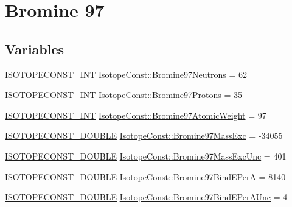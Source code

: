 \hypertarget{group___isotope_const-_bromine-_br97}{}\section{Bromine 97}
\label{group___isotope_const-_bromine-_br97}
\subsection*{Variables}
\begin{DoxyCompactItemize}
\item 
\mbox{\hyperlink{group___isotope_const-_macros_ga5f18360b3e99483a35c32d789e62621c}{I\+S\+O\+T\+O\+P\+E\+C\+O\+N\+S\+T\+\_\+\+I\+NT}} \mbox{\hyperlink{group___isotope_const-_bromine-_br97_ga8d974f27ddbcbc1719a4680f448e9ecb}{Isotope\+Const\+::\+Bromine97\+Neutrons}} = 62
\item 
\mbox{\hyperlink{group___isotope_const-_macros_ga5f18360b3e99483a35c32d789e62621c}{I\+S\+O\+T\+O\+P\+E\+C\+O\+N\+S\+T\+\_\+\+I\+NT}} \mbox{\hyperlink{group___isotope_const-_bromine-_br97_gaf2ad3b793c2c9725fee9b281a5376de7}{Isotope\+Const\+::\+Bromine97\+Protons}} = 35
\item 
\mbox{\hyperlink{group___isotope_const-_macros_ga5f18360b3e99483a35c32d789e62621c}{I\+S\+O\+T\+O\+P\+E\+C\+O\+N\+S\+T\+\_\+\+I\+NT}} \mbox{\hyperlink{group___isotope_const-_bromine-_br97_ga4f35e98183cc28f7e3f99f2aa4cc3824}{Isotope\+Const\+::\+Bromine97\+Atomic\+Weight}} = 97
\item 
\mbox{\hyperlink{group___isotope_const-_macros_ga8f45a7272ce02c0b4c65c44636ed719a}{I\+S\+O\+T\+O\+P\+E\+C\+O\+N\+S\+T\+\_\+\+D\+O\+U\+B\+LE}} \mbox{\hyperlink{group___isotope_const-_bromine-_br97_ga405ee8fab28bd677e2d9c79c1b1bfa1a}{Isotope\+Const\+::\+Bromine97\+Mass\+Exc}} = -\/34055
\item 
\mbox{\hyperlink{group___isotope_const-_macros_ga8f45a7272ce02c0b4c65c44636ed719a}{I\+S\+O\+T\+O\+P\+E\+C\+O\+N\+S\+T\+\_\+\+D\+O\+U\+B\+LE}} \mbox{\hyperlink{group___isotope_const-_bromine-_br97_gae0798852ac4cda65526deef8426605a4}{Isotope\+Const\+::\+Bromine97\+Mass\+Exc\+Unc}} = 401
\item 
\mbox{\hyperlink{group___isotope_const-_macros_ga8f45a7272ce02c0b4c65c44636ed719a}{I\+S\+O\+T\+O\+P\+E\+C\+O\+N\+S\+T\+\_\+\+D\+O\+U\+B\+LE}} \mbox{\hyperlink{group___isotope_const-_bromine-_br97_gae482b1161e0450d1d697bfaec1c71f32}{Isotope\+Const\+::\+Bromine97\+Bind\+E\+PerA}} = 8140
\item 
\mbox{\hyperlink{group___isotope_const-_macros_ga8f45a7272ce02c0b4c65c44636ed719a}{I\+S\+O\+T\+O\+P\+E\+C\+O\+N\+S\+T\+\_\+\+D\+O\+U\+B\+LE}} \mbox{\hyperlink{group___isotope_const-_bromine-_br97_ga3a2fb3e9caa25b0b6f672fe7536e0c86}{Isotope\+Const\+::\+Bromine97\+Bind\+E\+Per\+A\+Unc}} = 4

\end{DoxyCompactItemize}
